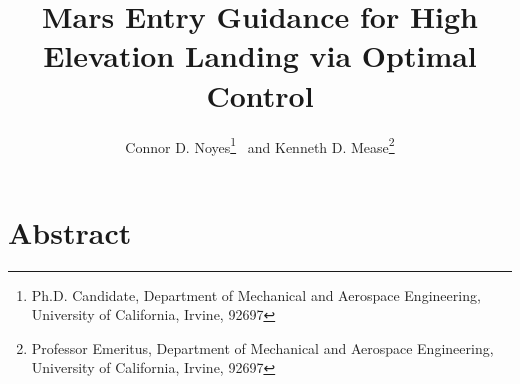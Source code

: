 \documentclass[journal ]{new-aiaa}
\title{Mars Entry Guidance for High Elevation Landing via Optimal Control}
\begin{document}
\author{Connor D. Noyes\thanks{Ph.D. Candidate, Department of Mechanical and Aerospace Engineering, University of California, Irvine, 92697} \ and Kenneth D. Mease\thanks{Professor Emeritus, Department of Mechanical and Aerospace Engineering, University of California, Irvine, 92697}}
\maketitle





\section*{Abstract}
\end{document}
